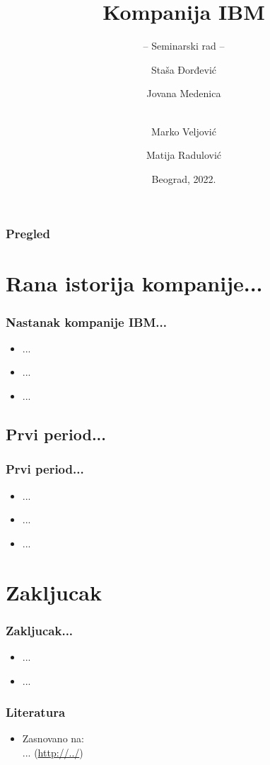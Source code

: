 \documentclass{beamer}
\title[]{Kompanija IBM}
\subtitle{-- Seminarski rad --}
\author[]{Staša Đorđević \and
Jovana Medenica \and  \\
Marko Veljović \and
Matija Radulović}
\institute[]{Matematički fakultet\\Univerzitet u Beogradu}
\date{
	\footnotesize{Beograd, 2022.}	
}
\begin{document}
\begin{frame}
	\thispagestyle{empty}
	\titlepage
	\end{frame}

\begin{frame}
	\frametitle{Pregled} %
	\tableofcontents[hidesubsections] 
\end{frame}

\section{Rana istorija kompanije...}

\begin{frame}[fragile]\frametitle{Nastanak kompanije IBM...}
	\begin{itemize}	
		\item ...
		\item ...
		\item ...
		\end{itemize}
\end{frame}

\subsection{Prvi period...}

\begin{frame}[fragile]\frametitle{Prvi period...}
	\begin{itemize}	
		\item ...
		\item ...
		\item ...
	\end{itemize}
\end{frame}

\section{Zakljucak}

\begin{frame}[fragile]\frametitle{Zakljucak...}
	\begin{itemize}	
		\item ...
		\item ...
	\end{itemize}
\end{frame}





\begin{frame}[fragile]\frametitle{Literatura}
	\begin{itemize}
		\item Zasnovano na:\\
		...
		(\url{http://../})
	\end{itemize}
\end{frame}
\end{document}
